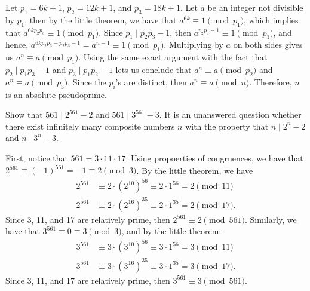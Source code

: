 \begin{solution}
    Let $p_1 = 6k+1$, $p_2 = 12k+1$, and $p_3 = 18k + 1$. Let $a$ be an integer not divisible by $p_1$, then by the little theorem, we have that $a^{6k} \equiv 1 \pmod{p_1}$, which implies that $a^{6kp_2p_3} \equiv 1 \pmod{p_1}$. Since $p_1 \mid p_2p_3 - 1$, then $a^{p_2p_3 - 1} \equiv 1 \pmod{p_1}$, and hence, $a^{6kp_2p_3 + p_2p_3 - 1} = a^{n - 1} \equiv 1 \pmod{p_1}$. Multiplying by $a$ on both sides gives us $a^n \equiv a \pmod{p_1}$. Using the same exact argument with the fact that $p_2 \mid p_1p_3 - 1$ and $p_3 \mid p_1p_2 - 1$ lets us conclude that $a^n \equiv a \pmod{p_2}$ and $a^n \equiv a \pmod{p_3}$. Since the $p_i$'s are distinct, then $a^n \equiv a \pmod n$. Therefore, $n$ is an absolute pseudoprime. \\
\end{solution}

\begin{exercise}
    Show that $561 \mid 2^{561} - 2$ and $561 \mid 3^{561} - 3$. It is an unanswered question whether there exist infinitely many composite numbers $n$ with the property that $n \mid 2^n - 2$ and $n \mid 3^n - 3$. \\
\end{exercise}

\begin{solution}
    First, notice that $561 = 3 \cdot 11 \cdot 17$. Using propoerties of congruences, we have that $2^{561} \equiv (-1)^{561} = -1 \equiv 2 \pmod 3$. By the little theorem, we have
    \begin{align*}
        2^{561} &\equiv 2 \cdot (2^{10})^{56} \equiv 2 \cdot 1^{56} = 2 \pmod{11} \\
        2^{561} &\equiv 2\cdot (2^{16})^{35} \equiv 2\cdot 1^{35} = 2 \pmod{17}.
    \end{align*}
    Since 3, 11, and 17 are relatively prime, then $2^{561} \equiv 2 \pmod{561}$. Similarly, we have that $3^{561} \equiv 0 \equiv 3 \pmod 3$, and by the little theorem:
    \begin{align*}
        3^{561} &\equiv 3 \cdot (3^{10})^{56} \equiv 3 \cdot 1^{56} = 3 \pmod{11} \\
        3^{561} &\equiv 3\cdot (3^{16})^{35} \equiv 3\cdot 1^{35} = 3 \pmod{17}.
    \end{align*}
    Since 3, 11, and 17 are relatively prime, then $3^{561} \equiv 3 \pmod{561}$.
\end{solution}